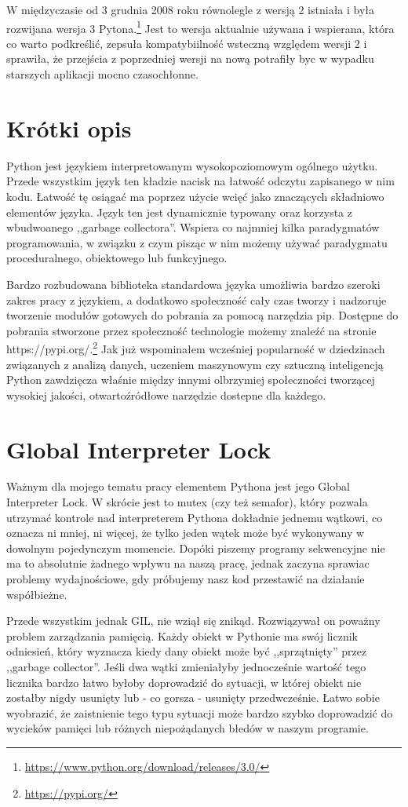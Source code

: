 W międzyczasie od 3 grudnia 2008 roku równolegle z wersją 2 istniała i była rozwijana wersja 3 Pytona.\footnote{\url{https://www.python.org/download/releases/3.0/}} Jest to wersja aktualnie używana i wspierana, która co warto podkreślić, zepsuła kompatybiilność wsteczną względem wersji 2 i sprawiła, że przejścia z poprzedniej wersji na nową potrafiły byc w wypadku starszych aplikacji mocno czasochłonne. 

\section{Krótki opis}
Python jest językiem interpretowanym wysokopoziomowym ogólnego użytku. Przede wszystkim język ten kładzie nacisk na łatwość odczytu zapisanego w nim kodu. Łatwość tę osiągać ma poprzez użycie wcięć jako znaczących składniowo elementów języka.  Język ten jest dynamicznie typowany oraz korzysta z wbudwoanego ,,garbage collectora''. Wspiera co najmniej kilka paradygmatów programowania, w związku z czym pisząc w nim możemy używać paradygmatu proceduralnego, obiektowego lub funkcyjnego.

Bardzo rozbudowana biblioteka standardowa języka umożliwia bardzo szeroki zakres pracy z językiem, a dodatkowo społeczność cały czas tworzy i nadzoruje tworzenie modułów gotowych do pobrania za pomocą narzędzia pip. Dostępne do pobrania stworzone przez społeczność technologie możemy znaleźć na stronie https://pypi.org/.\footnote{\url{https://pypi.org/}} Jak już wspominałem wcześniej popularność w dziedzinach związanych z analizą danych, uczeniem maszynowym czy sztuczną inteligencją Python zawdzięcza właśnie między innymi olbrzymiej społeczności tworzącej wysokiej jakości, otwartoźródłowe narzędzie dostepne dla każdego.

\section{Global Interpreter Lock}
Ważnym dla mojego tematu pracy elementem Pythona jest jego Global Interpreter Lock. W skrócie jest to mutex (czy też semafor), który pozwala utrzymać kontrole nad interpreterem Pythona dokładnie jednemu wątkowi, co oznacza ni mniej, ni więcej, że tylko jeden wątek może być wykonywany w dowolnym pojedynczym momencie. Dopóki piszemy programy sekwencyjne nie ma to absolutnie żadnego wpływu na naszą pracę, jednak zaczyna sprawiac problemy wydajnościowe, gdy próbujemy nasz kod przestawić na działanie współbieżne.

Przede wszystkim jednak GIL, nie wziął się znikąd. Rozwiązywał on poważny problem zarządzania pamięcią. Każdy obiekt w Pythonie ma swój licznik odniesień, który wyznacza kiedy dany obiekt może być ,,sprzątnięty'' przez ,,garbage collector''. Jeśli dwa wątki zmieniałyby jednocześnie wartość tego licznika bardzo łatwo byłoby doprowadzić do sytuacji, w której obiekt nie zostałby nigdy usunięty lub - co gorsza - usunięty przedwcześnie. Łatwo sobie wyobrazić, że zaistnienie tego typu sytuacji może bardzo szybko doprowadzić do wycieków pamięci lub różnych niepożądanych błedów w naszym programie.

